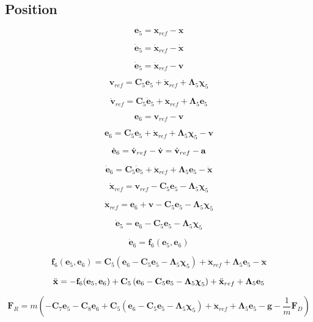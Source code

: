 \subsection{Position}

\[
\mathbf{e}_5 = \mathbf{x}_{ref} - \mathbf{x}
\]

\[
\dot{\mathbf{e}}_5 = \dot{\mathbf{x}}_{ref} - \dot{\mathbf{x}}
\]

\[
\dot{\mathbf{e}}_5 = \dot{\mathbf{x}}_{ref} - \mathbf{v}
\]

\[
\mathbf{v}_{ref} = \mathbf{C}_5 \mathbf{e}_5 + \dot{\mathbf{x}}_{ref} + \boldsymbol\Lambda_5 \boldsymbol\chi_5
\]

\[
\dot{\mathbf{v}}_{ref} = \mathbf{C}_5 \dot{\mathbf{e}}_5 + \ddot{\mathbf{x}}_{ref} + \boldsymbol\Lambda_5 \mathbf{e}_5
\]


\[
\mathbf{e}_6 = \mathbf{v}_{ref} - \mathbf{v}
\]

\[
\mathbf{e}_6 = \mathbf{C}_5 \mathbf{e}_5 + \dot{\mathbf{x}}_{ref} + \boldsymbol\Lambda_5 \boldsymbol\chi_5 - \mathbf{v}
\]

\[
\dot{\mathbf{e}}_6 = \dot{\mathbf{v}}_{ref} - \dot{\mathbf{v}} = \dot{\mathbf{v}}_{ref} - \mathbf{a}
\]

\[
\dot{\mathbf{e}}_6 = \mathbf{C}_5 \dot{\mathbf{e}}_5 + \ddot{\mathbf{x}}_{ref} + \boldsymbol\Lambda_5 \mathbf{e}_5 - \ddot{\mathbf{x}}
\]

\[
\dot{\mathbf{x}}_{ref} = \mathbf{v}_{ref} - \mathbf{C}_5 \mathbf{e}_5 - \boldsymbol\Lambda_5 \boldsymbol\chi_5
\]

\[
\dot{\mathbf{x}}_{ref} = \mathbf{e}_6 + \mathbf{v} - \mathbf{C}_5 \mathbf{e}_5 - \boldsymbol\Lambda_5 \boldsymbol\chi_5
\]

\[
\dot{\mathbf{e}}_5 = \mathbf{e}_6 - \mathbf{C}_5 \mathbf{e}_5 - \boldsymbol\Lambda_5 \boldsymbol\chi_5
\]

\[
\dot{\mathbf{e}}_6 = \mathbf{f}_6(\mathbf{e}_5,\mathbf{e}_6)
\]

\[
\mathbf{f}_6(\mathbf{e}_5,\mathbf{e}_6)
= \mathbf{C}_5 \left( \mathbf{e}_6 - \mathbf{C}_5 \mathbf{e}_5 - \boldsymbol\Lambda_5 \boldsymbol\chi_5 \right)
+ \ddot{\mathbf{x}}_{ref}
+ \boldsymbol\Lambda_5 \mathbf{e}_5
- \ddot{\mathbf{x}}
\]

\[
\ddot{\mathbf{x}}
= -\mathbf{f}_6(\mathbf{e}_5,\mathbf{e}_6)
+ \mathbf{C}_5 \left( \mathbf{e}_6 - \mathbf{C}_5 \mathbf{e}_5 - \boldsymbol\Lambda_5 \boldsymbol\chi_5 \right)
+ \ddot{\mathbf{x}}_{ref}
+ \boldsymbol\Lambda_5 \mathbf{e}_5
\]

\[
\mathbf{F}_{R}
= m \left(
	-\mathbf{C}_7 \mathbf{e}_5 - \mathbf{C}_8 \mathbf{e}_6
	+ \mathbf{C}_5 \left( \mathbf{e}_6 - \mathbf{C}_5 \mathbf{e}_5 - \boldsymbol\Lambda_5 \boldsymbol\chi_5 \right)
	+ \ddot{\mathbf{x}}_{ref}
	+ \boldsymbol\Lambda_5 \mathbf{e}_5
	- \mathbf{g}
	- \frac{1}{m} \mathbf{F}_{D}
\right)
\]

